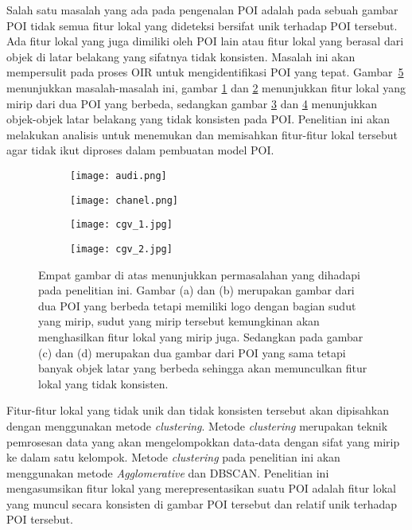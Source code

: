 Salah satu masalah yang ada pada pengenalan POI adalah pada sebuah gambar POI tidak semua fitur lokal yang dideteksi bersifat unik terhadap POI tersebut. Ada fitur lokal yang juga dimiliki oleh POI lain atau fitur lokal yang berasal dari objek di latar belakang yang sifatnya tidak konsisten. Masalah ini akan mempersulit pada proses OIR untuk mengidentifikasi POI yang tepat. Gambar~\ref{fig:keypoint_non_unique} menunjukkan masalah-masalah ini, gambar \ref{subfig:audi} dan \ref{subfig:chanel} menunjukkan fitur lokal yang mirip dari dua POI yang berbeda, sedangkan gambar \ref{subfig:cgv} dan \ref{subfig:cgv2} menunjukkan objek-objek latar belakang yang tidak konsisten pada POI. Penelitian ini akan melakukan analisis untuk menemukan dan memisahkan fitur-fitur lokal tersebut agar tidak ikut diproses dalam pembuatan model POI.

\begin{figure}[H]
	\begin{subfigure}[b]{.5\textwidth}
		\centering
		\texttt{[image: audi.png]}
		\caption{}
		\label{subfig:audi}
	\end{subfigure}%
	\begin{subfigure}[b]{.5\textwidth}
		\centering
		\texttt{[image: chanel.png]}
		\caption{}
		\label{subfig:chanel}
	\end{subfigure}
	\begin{subfigure}[b]{.5\textwidth}
		\centering
		\texttt{[image: cgv\_1.jpg]}
		\caption{}
		\label{subfig:cgv}
	\end{subfigure}%
	\begin{subfigure}[b]{.5\textwidth}
		\centering
		\texttt{[image: cgv\_2.jpg]}
		\caption{}
		\label{subfig:cgv2}
	\end{subfigure}
	\caption{Empat gambar di atas menunjukkan permasalahan yang dihadapi pada penelitian ini. Gambar (a) dan (b) merupakan gambar dari dua POI yang berbeda tetapi memiliki logo dengan bagian sudut yang mirip, sudut yang mirip tersebut kemungkinan akan menghasilkan fitur lokal yang mirip juga. Sedangkan pada gambar (c) dan (d) merupakan dua gambar dari POI yang sama tetapi banyak objek latar yang berbeda sehingga akan memunculkan fitur lokal yang tidak konsisten.}
	\label{fig:keypoint_non_unique}
\end{figure}
Fitur-fitur lokal yang tidak unik dan tidak konsisten tersebut akan dipisahkan dengan menggunakan metode \textit{clustering}. Metode \textit{clustering} merupakan teknik pemrosesan data yang akan mengelompokkan data-data dengan sifat yang mirip ke dalam satu kelompok. Metode \textit{clustering} pada penelitian ini akan menggunakan metode \textit{Agglomerative} dan DBSCAN. Penelitian ini mengasumsikan fitur lokal yang merepresentasikan suatu POI adalah fitur lokal yang muncul secara konsisten di gambar POI tersebut dan relatif unik terhadap POI tersebut.

